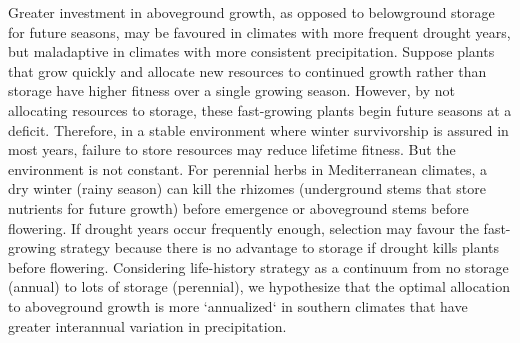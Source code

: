 \documentclass[11pt, oneside]{article}
\begin{document}
Greater investment in aboveground growth, as opposed to belowground storage for future seasons, may be favoured in climates with more frequent drought years, but maladaptive in climates with more consistent precipitation. Suppose plants that grow quickly and allocate new resources to continued growth rather than storage have higher fitness over a single growing season. However, by not allocating resources to storage, these fast-growing plants begin future seasons at a deficit. Therefore, in a stable environment where winter survivorship is assured in most years, failure to store resources may reduce lifetime fitness. But the environment is not constant. For perennial herbs in Mediterranean climates, a dry winter (rainy season) can kill the rhizomes (underground stems that store nutrients for future growth) before emergence or aboveground stems before flowering. If drought years occur frequently enough, selection may favour the fast-growing strategy because there is no advantage to storage if drought kills plants before flowering. Considering life-history strategy as a continuum from no storage (annual) to lots of storage (perennial), we hypothesize that the optimal allocation to aboveground growth is more `annualized` in southern climates that have greater interannual variation in precipitation.
\end{document}
